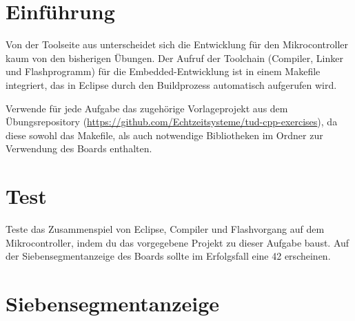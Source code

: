
\newcommand{\exday}{5}
\cppSetTitle
\setcounter{section}{-1}



\cppSetHeaderAndMakeTitle



\section*{Einführung}
Von der Toolseite aus unterscheidet sich die Entwicklung für den Mikrocontroller kaum von den bisherigen Übungen.
Der Aufruf der Toolchain (Compiler, Linker und Flashprogramm) für die Embedded-Entwicklung ist in einem Makefile integriert, das in Eclipse durch den Buildprozess automatisch aufgerufen wird.

Verwende für jede Aufgabe das zugehörige Vorlageprojekt aus dem Übungsrepository (\url{https://github.com/Echtzeitsysteme/tud-cpp-exercises}), da diese sowohl das Makefile, als auch notwendige Bibliotheken im Ordner  zur Verwendung des Boards enthalten.


\section{Test}
Teste das Zusammenspiel von Eclipse, Compiler und Flashvorgang auf dem Mikrocontroller, indem du das vorgegebene Projekt zu dieser Aufgabe baust.
Auf der Siebensegmentanzeige des Boards sollte im Erfolgsfall eine 42 erscheinen.



\section{Siebensegmentanzeige}
\label{exercise7Segment}


